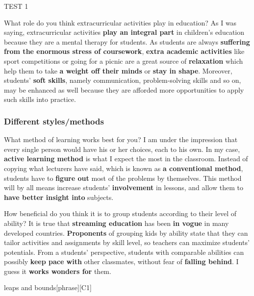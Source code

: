 \begin{glossarymc}[Cambridge 3]
\begin{test}{TEST 1}
\begin{qa}{What role do you think extracurricular activities play in education?}
    As I was saying, extracurricular activities \textbf{play an integral part} in children's education because they are a mental therapy for students. 
    As students are always \textbf{suffering from the enormous stress of coursework}, \textbf{extra academic activities} like sport competitions or going for a picnic are a great source of \textbf{relaxation} which help them to take \textbf{a weight off their minds} or \textbf{stay in shape}. 
    Moreover, students' \textbf{soft skills}, namely communication, problem-solving skills and so on, may be enhanced as well because they are afforded more opportunities to apply such skills into practice.
\end{qa}

\subsubsection*{Different styles/methods}

\begin{qa}{What method of learning works best for you?}
    I am under the impression that every single person would have his or her choices, each to his own. 
    In my case, \textbf{active learning method} is what I expect the most in the classroom. 
    Instead of copying what lecturers have said, which is known as \textbf{a conventional method}, students have to \textbf{figure out} most of the problems by themselves. 
    This method will by all means increase students' \textbf{involvement} in lessons, and allow them to \textbf{have better insight into} subjects.
\end{qa}

\begin{qa}{How beneficial do you think it is to group students according to their level of ability?}
    It is true that \textbf{streaming education} has been \textbf{in vogue} in many developed countries. 
    \textbf{Proponents} of grouping kids by ability state that they can tailor activities and assignments by skill level, so teachers can maximize students' potentials. 
    From a students' perspective, students with comparable abilities can possibly \textbf{keep pace with} other classmates, without fear of \textbf{falling behind}. 
    I guess it \textbf{works wonders for} them.
\end{qa}

\begin{VocabExplain}[Part 3]
    \begin{ExplainCard}{leaps and bounds}[phrase][C1]
\end{ExplainCard}


\end{VocabExplain}
\end{test}
\end{glossarymc}
